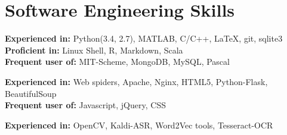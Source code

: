 \documentclass[10pt]{article} %
\begin{document}



\section{Software Engineering Skills}

{
\textbf{Experienced in:} Python(3.4, 2.7), MATLAB, C/C++, LaTeX, git, sqlite3\\[3pt]
\textbf{Proficient in:} Linux Shell, R, Markdown, Scala\\[3pt]
\textbf{Frequent user of:} MIT-Scheme, MongoDB, MySQL, Pascal\\
}


{
\textbf{Experienced in:} Web spiders, Apache, Nginx, HTML5, Python-Flask, BeautifulSoup \\[3pt]
\textbf{Frequent user of:} Javascript, jQuery, CSS \\
}

{
\textbf{Experienced in:} OpenCV, Kaldi-ASR, Word2Vec tools, Tesseract-OCR
}
\vspace{2mm}


\end{document}
